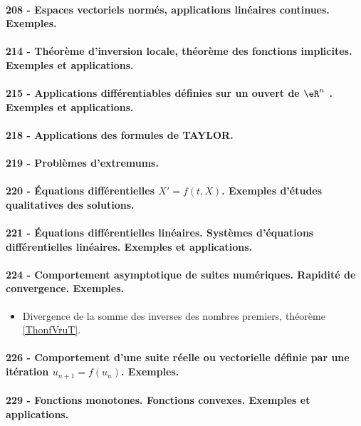 \paragraph{208 - Espaces vectoriels normés, applications linéaires continues. Exemples.}
\paragraph{214 - Théorème d’inversion locale, théorème des fonctions implicites. Exemples et applications.}
\paragraph{215 - Applications différentiables définies sur un ouvert de $\eR^n$ . Exemples et applications.}
\paragraph{218 - Applications des formules de TAYLOR.}
\paragraph{219 - Problèmes d’extremums.}
\paragraph{220 - Équations différentielles $X' = f (t , X )$. Exemples d’études qualitatives des solutions.}
\paragraph{221 - Équations différentielles linéaires. Systèmes d’équations différentielles linéaires. Exemples et applications.}
\paragraph{224 - Comportement asymptotique de suites numériques. Rapidité de convergence. Exemples.}
\begin{itemize}
    \item Divergence de la somme des inverses des nombres premiers, théorème \ref{ThonfVruT}.
\end{itemize}
\paragraph{226 - Comportement d’une suite réelle ou vectorielle définie par une itération \( u_{n+1}=f(u_n)\). Exemples.}
\paragraph{229 - Fonctions monotones. Fonctions convexes. Exemples et applications.}
